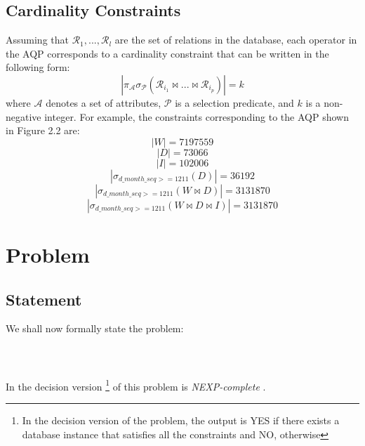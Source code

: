 \documentclass[]{article}
\begin{document}
\begin{multicols}{2}
		\subsection{Cardinality Constraints}
		Assuming that $\mathcal{R}_1, ... , \mathcal{R}_l$ are the set of relations in the database, each operator in the AQP corresponds to a cardinality constraint that can be written in the following form:
			\[ | \pi_\mathcal{A} \sigma_\mathcal{P} (\mathcal{R}_{i_1} \bowtie ... \bowtie \mathcal{R}_{i_p}) | = k\]
		where $\mathcal{A}$ denotes a set of attributes, $\mathcal{P}$ is a selection predicate, and $k$ is a non-negative integer.
		For example, the constraints corresponding to the AQP shown in Figure 2.2 are:
			\begin{equation*}
				|W| = 7197559
			\end{equation*}
			\begin{equation*}
				|D| = 73066
			\end{equation*}
			\begin{equation*}
				|I| = 102006
			\end{equation*}
			\begin{equation*}
				|\sigma_{d\_month\_seq >= 1211}(D)| = 36192
			\end{equation*}
			\begin{equation*}
				|\sigma_{d\_month\_seq >= 1211}(W \bowtie D)| = 3131870
			\end{equation*}
			\begin{equation*}
				|\sigma_{d\_month\_seq >= 1211}(W \bowtie D \bowtie I)| = 3131870
			\end{equation*}

	\section{Problem}
		\subsection{Statement}
		We shall now formally state the problem:
		\\ \\
		\\ \\
		In the decision version \footnote{In the decision version of the problem, the output is YES if there exists a database instance that satisfies all the constraints and NO, otherwise} of this problem is \textit{NEXP-complete} \cite{arasu}.
		

\end{multicols}
\end{document}
